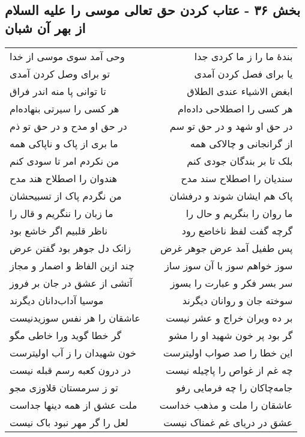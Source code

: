 \begin{center}
\section*{بخش ۳۶ - عتاب کردن حق تعالی موسی را علیه  السلام از بهر آن شبان}
\label{sec:sh036}
\begin{longtable}{l p{0.5cm} r}
وحی آمد سوی موسی از خدا
&&
بندهٔ ما را ز ما کردی جدا
\\
تو برای وصل کردن آمدی
&&
یا برای فصل کردن آمدی
\\
تا توانی پا منه اندر فراق
&&
ابغض الاشیاء عندی الطلاق
\\
هر کسی را سیرتی بنهاده‌ام
&&
هر کسی را اصطلاحی داده‌ام
\\
در حق او مدح و در حق تو ذم
&&
در حق او شهد و در حق تو سم
\\
ما بری از پاک و ناپاکی همه
&&
از گرانجانی و چالاکی همه
\\
من نکردم امر تا سودی کنم
&&
بلک تا بر بندگان جودی کنم
\\
هندوان را اصطلاح هند مدح
&&
سندیان را اصطلاح سند مدح
\\
من نگردم پاک از تسبیحشان
&&
پاک هم ایشان شوند و درفشان
\\
ما زبان را ننگریم و قال را
&&
ما روان را بنگریم و حال را
\\
ناظر قلبیم اگر خاشع بود
&&
گرچه گفت لفظ ناخاضع رود
\\
زانک دل جوهر بود گفتن عرض
&&
پس طفیل آمد عرض جوهر غرض
\\
چند ازین الفاظ و اضمار و مجاز
&&
سوز خواهم سوز با آن سوز ساز
\\
آتشی از عشق در جان بر فروز
&&
سر بسر فکر و عبارت را بسوز
\\
موسیا آداب‌دانان دیگرند
&&
سوخته جان و روانان دیگرند
\\
عاشقان را هر نفس سوزیدنیست
&&
بر ده ویران خراج و عشر نیست
\\
گر خطا گوید ورا خاطی مگو
&&
گر بود پر خون شهید او را مشو
\\
خون شهیدان را ز آب اولیترست
&&
این خطا را صد صواب اولیترست
\\
در درون کعبه رسم قبله نیست
&&
چه غم از غواص را پاچیله نیست
\\
تو ز سرمستان قلاوزی مجو
&&
جامه‌چاکان را چه فرمایی رفو
\\
ملت عشق از همه دینها جداست
&&
عاشقان را ملت و مذهب خداست
\\
لعل را گر مهر نبود باک نیست
&&
عشق در دریای غم غمناک نیست
\\
\end{longtable}
\end{center}
